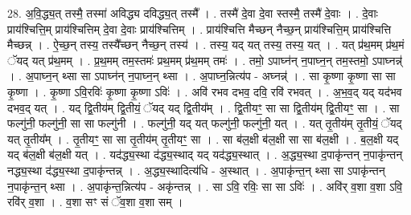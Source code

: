 \documentclass[17pt]{extarticle}
\begin{document}
28. अ॒वि॒द्ध्य॒त् तस्मै॒ तस्मा॑ अविद्ध्य दविद्ध्य॒त् तस्मै᳚ । . तस्मै॑ दे॒वा दे॒वा स्तस्मै॒ तस्मै॑ दे॒वाः । . दे॒वाः प्राय॑श्चित्ति॒म् प्राय॑श्चित्तिम् दे॒वा दे॒वाः प्राय॑श्चित्तिम् । . प्राय॑श्चित्ति मैच्छन् नैच्छ॒न् प्राय॑श्चित्ति॒म् प्राय॑श्चित्ति मैच्छन्न् । . ऐ॒च्छ॒न् तस्य॒ तस्यै᳚च्छन् नैच्छ॒न् तस्य॑ । . तस्य॒ यद् यत् तस्य॒ तस्य॒ यत् । . यत् प्र॑थ॒मम् प्र॑थ॒मं ॅयद् यत् प्र॑थ॒मम् । . प्र॒थ॒मम् तम॒स्तमः॑ प्रथ॒मम् प्र॑थ॒मम् तमः॑ । . तमो॒ ऽपाघ्न॑न् न॒पाघ्न॒न् तम॒स्तमो॒ ऽपाघ्नन्न्॑ । . अ॒पाघ्न॒न् थ्सा सा ऽपाघ्न॑न् न॒पाघ्न॒न् थ्सा । . अ॒पाघ्न॒न्नित्य॑प - अघ्नन्न्॑ । . सा कृ॒ष्णा कृ॒ष्णा सा सा कृ॒ष्णा । . कृ॒ष्णा ऽवि॒रविः॑ कृ॒ष्णा कृ॒ष्णा ऽविः॑ । . अवि॑ रभव दभव॒ दवि॒ रवि॑ रभवत् । . अ॒भ॒व॒द् यद् यद॑भव दभव॒द् यत् । . यद् द्वि॒तीय॑म् द्वि॒तीयं॒ ॅयद् यद् द्वि॒तीय᳚म् । . द्वि॒तीयꣳ॒॒ सा सा द्वि॒तीय॑म् द्वि॒तीयꣳ॒॒ सा । . सा फल्गु॑नी॒ फल्गु॑नी॒ सा सा फल्गु॑नी । . फल्गु॑नी॒ यद् यत् फल्गु॑नी॒ फल्गु॑नी॒ यत् । . यत् तृ॒तीय॑म् तृ॒तीयं॒ ॅयद् यत् तृ॒तीय᳚म् । . तृ॒तीयꣳ॒॒ सा सा तृ॒तीय॑म् तृ॒तीयꣳ॒॒ सा । . सा ब॑ल॒क्षी ब॑ल॒क्षी सा सा ब॑ल॒क्षी । . ब॒ल॒क्षी यद् यद् ब॑ल॒क्षी ब॑ल॒क्षी यत् । . यद॑द्ध्य॒स्था द॑द्ध्य॒स्थाद् यद् यद॑द्ध्य॒स्थात् । . अ॒द्ध्य॒स्था द॒पाकृ॑न्तन् न॒पाकृ॑न्तन् नद्ध्य॒स्था द॑द्ध्य॒स्था द॒पाकृ॑न्तन्न् । . अ॒द्ध्य॒स्थादित्य॑धि - अ॒स्थात् । . अ॒पाकृ॑न्त॒न् थ्सा सा ऽपाकृ॑न्तन् न॒पाकृ॑न्त॒न् थ्सा । . अ॒पाकृ॑न्त॒न्नित्य॑प - अकृ॑न्तन्न् । . सा ऽवि॒ रविः॒ सा सा ऽविः॑ । . अवि॑र् व॒शा व॒शा ऽवि॒ रवि॑र् व॒शा । . व॒शा सꣳ सं ॅव॒शा व॒शा सम् । \newline
\end{document}

